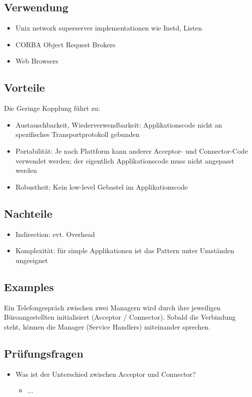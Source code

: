 \subsection*{Verwendung}
\begin{itemize}
	\item Unix network superserver implementationen wie Inetd, Listen
	\item CORBA Object Request Brokers
	\item Web Browsers
\end{itemize}

\subsection*{Vorteile}

Die Geringe Kopplung führt zu:
\begin{itemize}
	\item Austauschbarkeit, Wiederverwendbarkeit: Applikationscode nicht an spezifisches Transportprotokoll gebunden
	\item Portabilität: Je nach Plattform kann anderer Acceptor- und Connector-Code verwendet werden; der eigentlich Applikationscode muss nicht angepasst werden
	\item Robustheit: Kein low-level Gebastel im Applikationscode
\end{itemize}


\subsection*{Nachteile}
\begin{itemize}
	\item Indirection: evt. Overhead
	\item Komplexität: für simple Applikationen ist das Pattern unter Umständen ungeeignet
\end{itemize}

\subsection*{Examples}

Ein Telefongespräch zwischen zwei Managern wird durch ihre jeweiligen Büroangestellten initialisiert (Acceptor / Connector). Sobald die Verbindung steht, können die Manager (Service Handlers) miteinander sprechen.

\subsection*{Prüfungsfragen}
\begin{itemize}
	\item Was ist der Unterschied zwischen Acceptor und Connector?
	\begin{itemize}
		\item ...
	\end{itemize}
\end{itemize}
